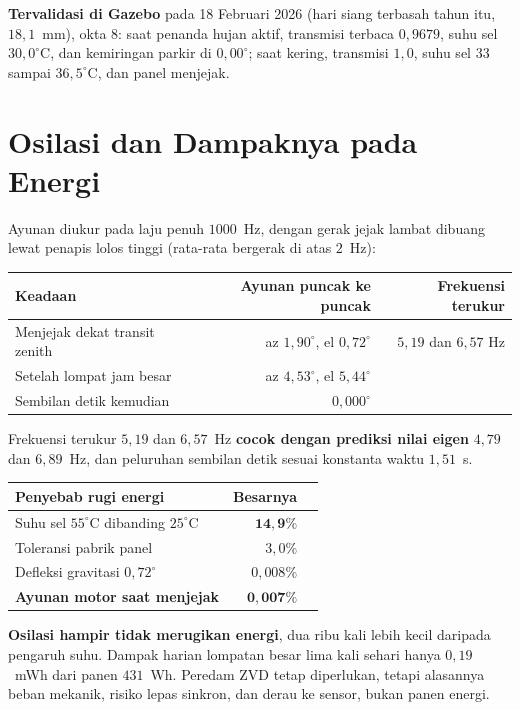 \documentclass[11pt,a4paper]{article}
\newcommand{\degg}{^\circ}
\begin{document}
\textbf{Tervalidasi di Gazebo} pada 18 Februari 2026 (hari siang terbasah tahun itu, $18{,}1$~mm), okta 8:
saat penanda hujan aktif, transmisi terbaca $0{,}9679$, suhu sel $30{,}0\degg$C, dan kemiringan parkir di
$0{,}00\degg$; saat kering, transmisi $1{,}0$, suhu sel $33$ sampai $36{,}5\degg$C, dan panel menjejak.

\section{Osilasi dan Dampaknya pada Energi}

Ayunan diukur pada laju penuh $1000$~Hz, dengan gerak jejak lambat dibuang lewat penapis lolos tinggi
(rata-rata bergerak di atas $2$~Hz):

\begin{longtable}{l r r}
\toprule
\textbf{Keadaan} & \textbf{Ayunan puncak ke puncak} & \textbf{Frekuensi terukur} \\
\midrule
Menjejak dekat transit zenith & az $1{,}90\degg$, el $0{,}72\degg$ & $5{,}19$ dan $6{,}57$ Hz \\
Setelah lompat jam besar & az $4{,}53\degg$, el $5{,}44\degg$ & \\
Sembilan detik kemudian & $0{,}000\degg$ & \\
\bottomrule
\end{longtable}

Frekuensi terukur $5{,}19$ dan $6{,}57$~Hz \textbf{cocok dengan prediksi nilai eigen} $4{,}79$ dan
$6{,}89$~Hz, dan peluruhan sembilan detik sesuai konstanta waktu $1{,}51$~s.

\begin{longtable}{l r r}
\toprule
\textbf{Penyebab rugi energi} & \textbf{Besarnya} & \\
\midrule
Suhu sel $55\degg$C dibanding $25\degg$C & $\bm{14{,}9\%}$ & \\
Toleransi pabrik panel & $3{,}0\%$ & \\
Defleksi gravitasi $0{,}72\degg$ & $0{,}008\%$ & \\
\textbf{Ayunan motor saat menjejak} & $\bm{0{,}007\%}$ & \\
\bottomrule
\end{longtable}

\textbf{Osilasi hampir tidak merugikan energi}, dua ribu kali lebih kecil daripada pengaruh suhu. Dampak
harian lompatan besar lima kali sehari hanya $0{,}19$~mWh dari panen $431$~Wh. Peredam ZVD tetap diperlukan,
tetapi alasannya beban mekanik, risiko lepas sinkron, dan derau ke sensor, bukan panen energi.
\end{document}
